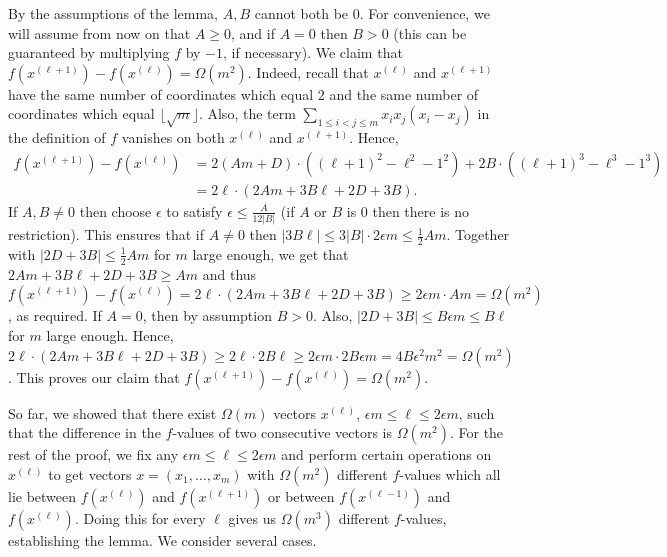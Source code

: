 \documentclass[11pt]{article}
\let\oldendproof\endproof
\renewenvironment{proof}[1][\proofname]{%
	\oldproof[\bf #1]%
}{\oldendproof}
\theoremstyle{plain}
\begin{document}
\begin{proof}[Proof of Lemma \ref{general-values-lemma}]
    By the assumptions of the lemma, $A,B$ cannot both be $0$. 
    For convenience, we will assume from now on that $A \geq 0$, and if $A = 0$ then $B > 0$ (this can be guaranteed by multiplying $f$ by $-1$, if necessary).
    We claim that $f(x^{(\ell+1)}) - f(x^{(\ell)}) = \Omega(m^2)$. 
    Indeed, recall that $x^{(\ell)}$ and $x^{(\ell+1)}$ have the same number of coordinates which equal $2$ and the same number of coordinates which equal $\lfloor \sqrt{m} \rfloor$. Also, the term $\sum_{1 \leq i < j \leq m} x_i x_j (x_i - x_j)$ in the definition of $f$ vanishes on both $x^{(\ell)}$ and $x^{(\ell+1)}$. Hence,
    \begin{align*}
        f(x^{(\ell+1)}) - f(x^{(\ell)})   
        &= 2(Am+D)\cdot ((\ell+1)^2 - \ell^2 - 1^2) + 2B \cdot ((\ell+1)^3 - \ell^3 - 1^3) \\
        &= 2\ell \cdot (2Am + 3B\ell + 2D + 3B).
    \end{align*}
    If $A,B \neq 0$ then choose $\epsilon$ to satisfy $\epsilon \leq \frac{A}{12|B|}$ (if $A$ or $B$ is 0 then there is no restriction).
    This ensures that if $A \neq 0$ then
    $|3B\ell| \leq 3|B| \cdot 2 \epsilon m \leq \frac{1}{2}Am$. Together with 
    $|2D + 3B| \leq \frac{1}{2}Am$ for $m$ large enough, we get that
    $2Am + 3B\ell + 2D + 3B \geq Am$ and thus 
    $f(x^{(\ell+1)}) - f(x^{(\ell)}) = 2\ell \cdot (2Am + 3B\ell + 2D + 3B) \geq 2 \epsilon m \cdot Am = \Omega(m^2)$, as required.
    If $A = 0$, then by assumption $B > 0$. Also, $|2D + 3B| \leq B \epsilon m \leq B\ell$ for $m$ large enough. Hence, $2\ell \cdot(2Am + 3B\ell + 2D + 3B) \geq 2\ell \cdot 2B\ell \geq
    2 \epsilon m \cdot 2B \epsilon m = 4B \epsilon^2 m^2 = \Omega(m^2)$.
    This proves our claim that $f(x^{(\ell+1)}) - f(x^{(\ell)}) = \Omega(m^2)$.

    So far, we showed that there exist $\Omega(m)$ vectors $x^{(\ell)}$, $\epsilon m \leq \ell \leq 2\epsilon m$, such that the difference in the $f$-values of two consecutive vectors is 
    $\Omega(m^2)$. 
	For the rest of the proof, we fix any $\epsilon m \leq \ell \leq 2\epsilon m$ 
    and perform certain operations on $x^{(\ell)}$ to get vectors $x = (x_1,\dots,x_m)$ with 
    $\Omega(m^2)$ different $f$-values which all lie between $f(x^{(\ell)})$ and $f(x^{(\ell+1)})$ or between $f(x^{(\ell-1)})$ and $f(x^{(\ell)})$. Doing this for every $\ell$ gives us $\Omega(m^3)$ different $f$-values, establishing the lemma. We consider several cases.


\end{proof}
\end{document}
